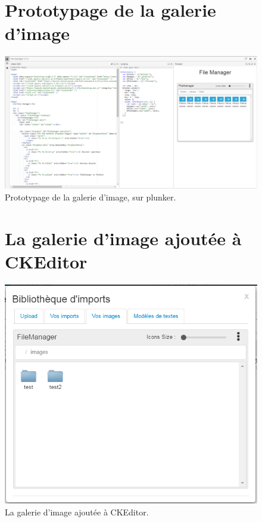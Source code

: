 \begin{appendices}
\begin{figure}[H]
	\section*{Prototypage de la galerie d'image}
	\centering
	\centerline{\includegraphics[width=20cm]{./img/proto_filemanager}} 
	\caption{\label{fig:proto_filemanager} Prototypage de la galerie d'image, sur plunker.}
\end{figure}

\newpage
\begin{figure}[H]
	\section*{La galerie d'image ajoutée à CKEditor}
	\centering
	\includegraphics[width=16cm]{./img/imports} 
	\caption{\label{fig:editeur_imports} La galerie d'image ajoutée à CKEditor.}
\end{figure}



\end{appendices}
